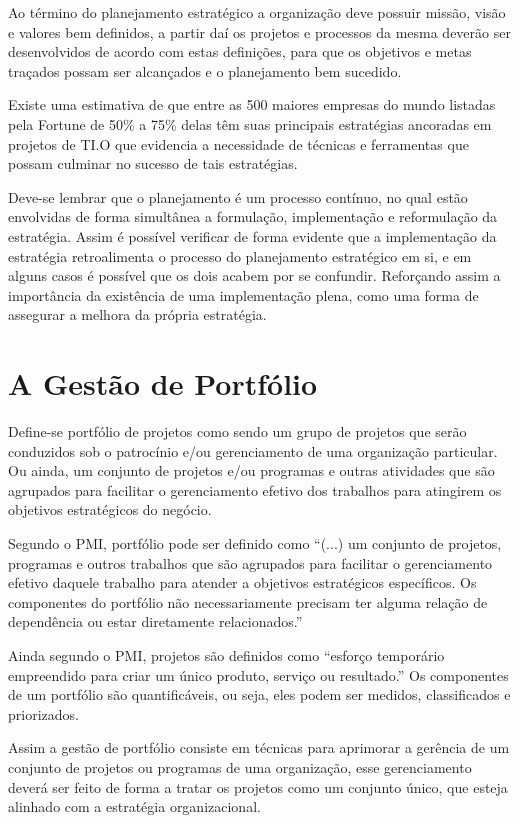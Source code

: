 \documentclass[12pt,a4paper,ruledheader,tocpage=prefix,floatnumber=continuous,pagestart=folhaderosto,font=times]{abnt}
\begin{document}
Ao término do planejamento estratégico a organização deve possuir missão, visão e valores bem definidos, a partir daí os projetos e processos da mesma
deverão ser desenvolvidos de acordo com estas definições, para que os objetivos e metas traçados possam ser alcançados e o planejamento bem sucedido.

Existe uma estimativa de que entre as 500 maiores empresas do mundo listadas pela Fortune de 50\% a 75\% delas têm suas principais estratégias ancoradas 
em projetos de TI.O que evidencia a necessidade de técnicas e ferramentas que possam culminar no sucesso de tais estratégias.

Deve-se lembrar que o planejamento é um processo contínuo, no qual estão envolvidas de forma simultânea a formulação, implementação e reformulação da
estratégia. Assim é possível verificar de forma evidente que a implementação da estratégia retroalimenta o processo do planejamento estratégico em si, 
e em alguns casos é possível que os dois acabem por se confundir. Reforçando assim a importância da existência de uma implementação plena, como uma forma
de assegurar a melhora da própria estratégia.

\chapter{A Gestão de Portfólio}
Define-se portfólio de projetos como sendo um grupo de projetos que serão conduzidos sob o patrocínio e/ou gerenciamento de uma organização particular.  
Ou ainda, um conjunto de projetos e/ou programas e outras atividades que são agrupados para facilitar o gerenciamento efetivo dos trabalhos para 
atingirem os objetivos estratégicos do negócio.

Segundo o PMI, portfólio pode ser definido como ``(...) um conjunto de projetos, programas e outros trabalhos que são 
agrupados para facilitar o gerenciamento efetivo daquele trabalho para atender a objetivos estratégicos específicos. Os componentes do portfólio não 
necessariamente precisam ter alguma relação de dependência ou estar diretamente relacionados.''

Ainda segundo o PMI, projetos são definidos como ``esforço temporário empreendido para criar um único produto, serviço ou resultado.'' Os componentes de 
um portfólio são quantificáveis, ou seja, eles podem ser medidos, classificados e priorizados.\cite{sppm}

Assim a gestão de portfólio consiste em técnicas para aprimorar a gerência de um conjunto de projetos ou programas de uma organização, esse gerenciamento
deverá ser feito de forma a tratar os projetos como um conjunto único, que esteja alinhado com a estratégia organizacional. 
\end{document}
